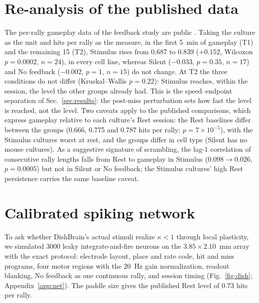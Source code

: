 \documentclass[pre,twocolumn,superscriptaddress,showpacs=false,amsmath,amssymb,nofootinbib]{revtex4-2}
\begin{document}
\section{Re-analysis of the published data}\label{sec:data}

The per-rally gameplay data of the feedback study are public \cite{OSF2022}. Taking the culture as the unit and hits per rally as the measure, in the first 5~min of gameplay (T1) and the remaining 15 (T2), Stimulus rises from 0.687 to 0.839 ($+0.152$, Wilcoxon $p=0.0002$, $n=24$), in every cell line, whereas Silent ($-0.033$, $p=0.35$, $n=17$) and No feedback ($-0.002$, $p=1$, $n=15$) do not change. At T2 the three conditions do not differ (Kruskal--Wallis $p=0.22$): Stimulus reaches, within the session, the level the other groups already had. This is the speed--endpoint separation of Sec.~\ref{sec:results}: the post-miss perturbation sets how fast the level is reached, not the level. Two caveats apply to the published comparisons, which express gameplay relative to each culture's Rest session: the Rest baselines differ between the groups (0.666, 0.775 and 0.787 hits per rally; $p=7\times10^{-5}$), with the Stimulus cultures worst at rest, and the groups differ in cell type (Silent has no mouse cultures). As a suggestive signature of scrambling, the lag-1 correlation of consecutive rally lengths falls from Rest to gameplay in Stimulus ($0.098\to0.026$, $p=0.0005$) but not in Silent or No feedback; the Stimulus cultures' high Rest persistence carries the same baseline caveat.

\section{Calibrated spiking network}\label{sec:net}

To ask whether DishBrain's actual stimuli realize $\kappa<1$ through local plasticity, we simulated 3000 leaky integrate-and-fire neurons on the $3.85\times2.10$~mm array with the exact protocol: electrode layout, place and rate code, hit and miss programs, four motor regions with the 20~Hz gain normalization, readout blanking, No feedback as one continuous rally, and session timing (Fig.~\ref{fig:dish}; Appendix~\ref{app:net}). The paddle size gives the published Rest level of 0.73 hits per rally.
\end{document}
